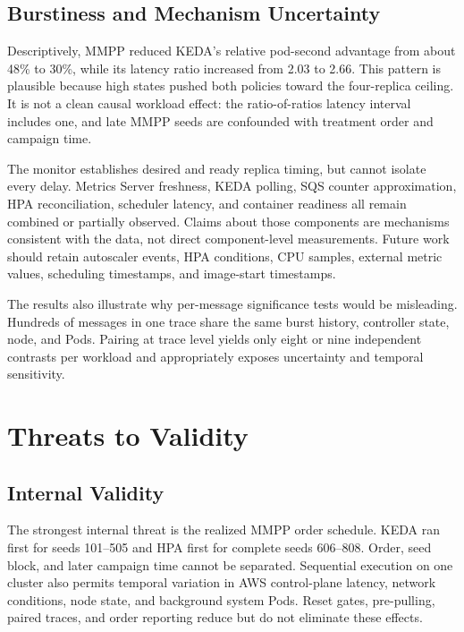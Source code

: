 \documentclass[conference]{IEEEtran}
\begin{document}
\subsection{Burstiness and Mechanism Uncertainty}

Descriptively, MMPP reduced KEDA's relative pod-second advantage from about 48\%
to 30\%, while its latency ratio increased from 2.03 to 2.66. This pattern is
plausible because high states pushed both policies toward the four-replica
ceiling. It is not a clean causal workload effect: the ratio-of-ratios latency
interval includes one, and late MMPP seeds are confounded with treatment order
and campaign time.

The monitor establishes desired and ready replica timing, but cannot isolate
every delay. Metrics Server freshness, KEDA polling, SQS counter approximation,
HPA reconciliation, scheduler latency, and container readiness all remain
combined or partially observed. Claims about those components are mechanisms
consistent with the data, not direct component-level measurements. Future work
should retain autoscaler events, HPA conditions, CPU samples, external metric
values, scheduling timestamps, and image-start timestamps.

The results also illustrate why per-message significance tests would be
misleading. Hundreds of messages in one trace share the same burst history,
controller state, node, and Pods. Pairing at trace level yields only eight or
nine independent contrasts per workload and appropriately exposes uncertainty
and temporal sensitivity.

\section{Threats to Validity}

\subsection{Internal Validity}

The strongest internal threat is the realized MMPP order schedule. KEDA ran
first for seeds 101--505 and HPA first for complete seeds 606--808. Order, seed
block, and later campaign time cannot be separated. Sequential execution on one
cluster also permits temporal variation in AWS control-plane latency, network
conditions, node state, and background system Pods. Reset gates, pre-pulling,
paired traces, and order reporting reduce but do not eliminate these effects.
\end{document}
